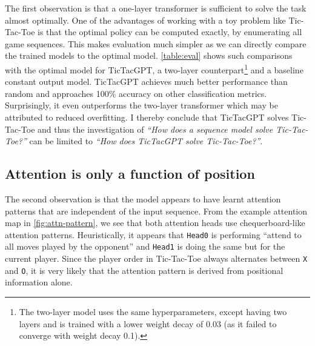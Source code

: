 \documentclass{article}
\newcommand{\ttgpt}{TicTacGPT\xspace}
\newcommand{\ttt}{Tic-Tac-Toe\xspace}
\newcounter{num}
\begin{document}
The first observation is that a one-layer transformer is sufficient to solve the task almost optimally. One of the advantages of working with a toy problem like \ttt is that the optimal policy can be computed exactly, by enumerating all game sequences. This makes evaluation much simpler as we can directly compare the trained models to the optimal model. \cref{table:eval} shows such comparisons with the optimal model for \ttgpt, a two-layer counterpart\footnote{The two-layer model uses the same hyperparameters, except having two layers and is trained with a lower weight decay of 0.03 (as it failed to converge with weight decay 0.1).} and a baseline constant output model. \ttgpt achieves much better performance than random and approaches 100\% accuracy on other classification metrics. Surprisingly, it even outperforms the two-layer transformer which may be attributed to reduced overfitting. I thereby conclude that \ttgpt solves \ttt and thus the investigation of \emph{``How does a sequence model solve \ttt?''} can be limited to \emph{``How does \ttgpt solve \ttt?''}.

\subsection{Attention is only a function of position} \label{sec:simplify-attn}



The second observation is that the model appears to have learnt attention patterns that are independent of the input sequence. From the example attention map in \cref{fig:attn-pattern}, we see that both attention heads use chequerboard-like attention patterns. Heuristically, it appears that \texttt{Head0} is performing ``attend to all moves played by the opponent'' and \texttt{Head1} is doing the same but for the current player. Since the player order in \ttt always alternates between \texttt{X} and \texttt{O}, it is very likely that the attention pattern is derived from positional information alone.
\end{document}
